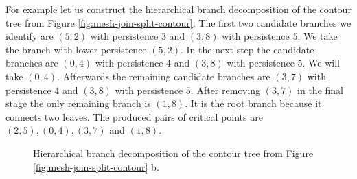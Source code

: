 For example let us construct the hierarchical branch decomposition of the contour tree from Figure \ref{fig:mesh-join-split-contour}. The first two candidate branches we identify are $(5, 2)$ with persistence $3$ and $(3, 8)$ with persistence $5$. We take the branch with lower persistence $(5, 2)$. In the next step the candidate branches are $(0, 4)$ with persistence $4$ and $(3, 8)$ with persistence $5$. We will take $(0, 4)$.
Afterwards the remaining candidate branches are $(3, 7)$ with persistence $4$ and $(3, 8)$ with persistence $5$. After removing $(3, 7)$ in the final stage the only remaining branch is $(1, 8)$. It is the root branch because it connects two leaves.
The produced pairs of critical points are $(2, 5), (0, 4), (3, 7)$ and $(1,8)$.

\begin{figure}%
    \centering
    \caption{Hierarchical branch decomposition of the contour tree from Figure \ref{fig:mesh-join-split-contour} b.}%
    \label{fig:branch-decomp}%
\end{figure}

